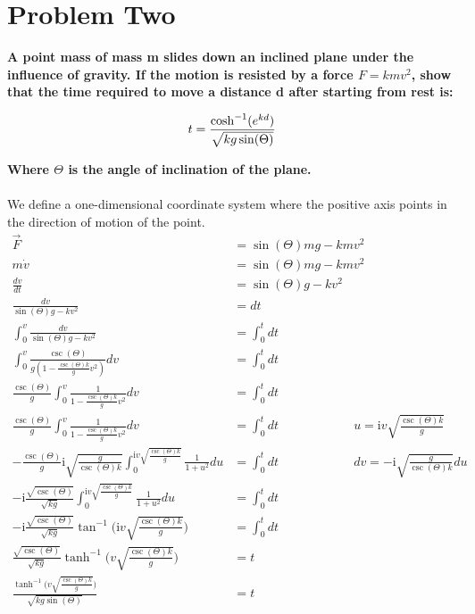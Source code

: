 \documentclass[10pt]{article} %
\begin{document}
\vspace{1 cm}

\section{Problem Two}
\textbf{A point mass of mass m slides down an inclined plane under the influence of gravity. If the motion is resisted by a force $F=kmv^2$, show that the time required to move a distance d after starting from rest is:}

\begin{equation*}
  t = \frac{\cosh^{-1}(e^{kd})}{\sqrt{kg\sin(\Theta)}}\\
\end{equation*}

\textbf{Where $\Theta$ is the angle of inclination of the plane.} \\ \\

We define a one-dimensional coordinate system where the positive axis points in the direction of motion of the point.\\

\begin{align*}
  \vec{F} &= \sin(\Theta)mg - kmv^2\\
  m\dot{v} &= \sin(\Theta)mg - kmv^2\\
  \frac{dv}{dt} &= \sin(\Theta)g - kv^2\\
  \frac{dv}{\sin(\Theta)g - kv^2} &= dt\\
  \int_0^{v} \frac{dv}{\sin(\Theta)g - kv^2} &= \int_0^t dt\\
  \int_0^{v} \frac{\csc(\Theta)}{g(1 - \frac{\csc(\Theta)k}{g}v^2)}dv &= \int_0^t dt\\
  \frac{\csc(\Theta)}{g}\int_0^{v} \frac{1}{1 - \frac{\csc(\Theta)k}{g}v^2}dv &= \int_0^t dt\\
  \frac{\csc(\Theta)}{g}\int_0^{v} \frac{1}{1 - \frac{\csc(\Theta)k}{g}v^2}dv &= \int_0^t dt
  \hspace{1in} u = \mathrm{i}v\sqrt{\frac{\csc(\Theta)k}{g}}\\
  -\frac{\csc(\Theta)}{g}\mathrm{i}\sqrt{\frac{g}{\csc(\Theta)k}}\int_0^{\mathrm{i}v\sqrt{\frac{\csc(\Theta)k}{g}}} \frac{1}{1 + u^2}du &= \int_0^t dt
  \hspace{1in} dv = -\mathrm{i}\sqrt{\frac{g}{\csc(\Theta)k}}du\\
  -\mathrm{i}\frac{\sqrt{\csc(\Theta)}}{\sqrt{kg}} \int_0^{\mathrm{i}v\sqrt{\frac{\csc(\Theta)k}{g}}} \frac{1}{1 + u^2}du &= \int_0^t dt\\
  -\mathrm{i}\frac{\sqrt{\csc(\Theta)}}{\sqrt{kg}} \tan^{-1}\Bigg(\mathrm{i}v\sqrt{\frac{\csc(\Theta)k}{g}}\Bigg) &= \int_0^t dt\\
  \frac{\sqrt{\csc(\Theta)}}{\sqrt{kg}} \tanh^{-1}\Bigg(v\sqrt{\frac{\csc(\Theta)k}{g}}\Bigg) &= t\\
  \frac{\tanh^{-1}\Bigg(v\sqrt{\frac{\csc(\Theta)k}{g}}\Bigg)}{\sqrt{kg\sin(\Theta)}} &= t\\ 
\end{align*}
\end{document}
